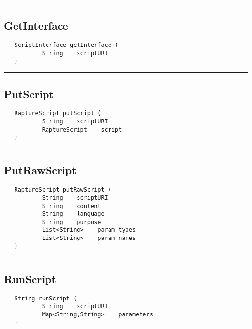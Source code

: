 \rule{15cm}{2pt}
\subsection{GetInterface}
\label{Api:GetInterface}
\begin{verbatim}
   ScriptInterface getInterface (
           String    scriptURI
   )
\end{verbatim}



\rule{15cm}{2pt}
\subsection{PutScript}
\label{Api:PutScript}
\begin{verbatim}
   RaptureScript putScript (
           String    scriptURI
           RaptureScript    script
   )
\end{verbatim}



\rule{15cm}{2pt}
\subsection{PutRawScript}
\label{Api:PutRawScript}
\begin{verbatim}
   RaptureScript putRawScript (
           String    scriptURI
           String    content
           String    language
           String    purpose
           List<String>    param_types
           List<String>    param_names
   )
\end{verbatim}



\rule{15cm}{2pt}
\subsection{RunScript}
\label{Api:RunScript}
\begin{verbatim}
   String runScript (
           String    scriptURI
           Map<String,String>    parameters
   )
\end{verbatim}



